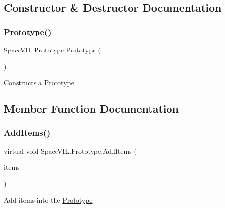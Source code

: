 \subsection{Constructor \& Destructor Documentation}
\mbox{\label{class_space_v_i_l_1_1_prototype_a9205e6953992749881d7de1af9dc492e}} 
\subsubsection{\texorpdfstring{Prototype()}{Prototype()}}
{\footnotesize\ttfamily Space\+V\+I\+L.\+Prototype.\+Prototype (\begin{DoxyParamCaption}{ }\end{DoxyParamCaption})}



Constructs a \mbox{\hyperlink{class_space_v_i_l_1_1_prototype}{Prototype}} 



\subsection{Member Function Documentation}
\mbox{\label{class_space_v_i_l_1_1_prototype_a41f1a65df4f13b958dfdab342266a357}} 
\subsubsection{\texorpdfstring{Add\+Items()}{AddItems()}}
{\footnotesize\ttfamily virtual void Space\+V\+I\+L.\+Prototype.\+Add\+Items (\begin{DoxyParamCaption}\item[{params \mbox{\hyperlink{interface_space_v_i_l_1_1_core_1_1_i_base_item}{I\+Base\+Item}} \mbox{[}$\,$\mbox{]}}]{items }\end{DoxyParamCaption})\hspace{0.3cm}{\ttfamily [virtual]}}



Add items into the \mbox{\hyperlink{class_space_v_i_l_1_1_prototype}{Prototype}} 


